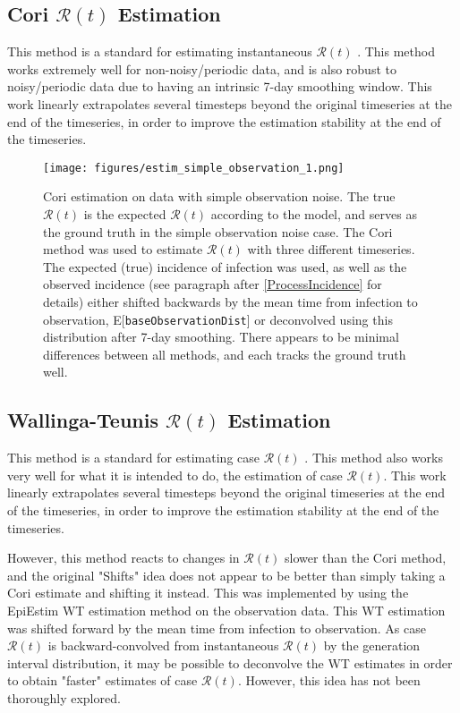 \documentclass{article}
\newcommand{\nR}{\mathcal{R}}
\newcommand{\code}[1]{\texttt{#1}}
\begin{document}
\subsection{Cori $\nR(t)$ Estimation}
This method is a standard for estimating instantaneous $\nR(t)$ \cite{Cori}. This method works extremely well for non-noisy/periodic data, and is also robust to noisy/periodic data due to having an intrinsic 7-day smoothing window. This work linearly extrapolates several timesteps beyond the original timeseries at the end of the timeseries, in order to improve the estimation stability at the end of the timeseries.

\clearpage
\begin{figure}[h!]
    \centering
    \texttt{[image: figures/estim\_simple\_observation\_1.png]}
    \caption{Cori estimation on data with simple observation noise. The true $\nR(t)$ is the expected $\nR(t)$ according to the model, and serves as the ground truth in the simple observation noise case. The Cori method was used to estimate $\nR(t)$ with three different timeseries. The expected (true) incidence of infection was used, as well as the observed incidence (see paragraph after \ref{ProcessIncidence} for details) either shifted backwards by the mean time from infection to observation, E[\code{baseObservationDist}] or deconvolved using this distribution after 7-day smoothing. There appears to be minimal differences between all methods, and each tracks the ground truth well.}
\end{figure}


\subsection{Wallinga-Teunis $\nR(t)$ Estimation}
This method is a standard for estimating case $\nR(t)$ \cite{WallingaTeunis}. This method also works very well for what it is intended to do, the estimation of case $\nR(t)$. This work linearly extrapolates several timesteps beyond  the original timeseries at the end of the timeseries, in order to improve the estimation stability at the end of the timeseries.

However, this method reacts to changes in $\nR(t)$ slower than the Cori method, and the original "Shifts" idea does not appear to be better than simply taking a Cori estimate and shifting it instead. This was implemented by using the EpiEstim WT estimation method on the observation data. This WT estimation was shifted forward by the mean time from infection to observation. As case $\nR(t)$  is backward-convolved from instantaneous $\nR(t)$ by the generation interval distribution, it may be possible to deconvolve the WT estimates in order to obtain "faster" estimates of case $\nR(t)$. However, this idea has not been thoroughly explored.
\end{document}
